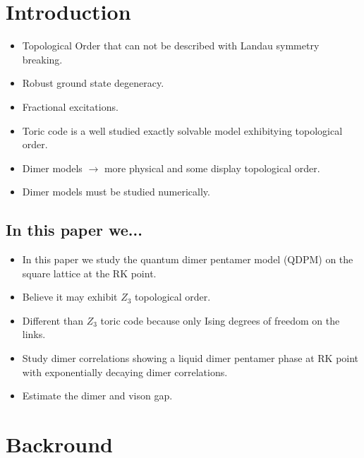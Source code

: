 \documentclass[aps,floatfix,11pt]{revtex4-1}
\begin{document}
\section{Introduction}

    \begin{itemize}
        \item Topological Order that can not be described with Landau symmetry breaking.
        \item Robust ground state degeneracy.
        \item Fractional excitations.
        \item Toric code is a well studied exactly solvable model exhibitying topological order.
        \item Dimer models $\rightarrow$ more physical and some display topological order.
        \item Dimer models must be studied numerically.
    \end{itemize}

    \subsection{In this paper we... }
        \begin{itemize}
            \item In this paper we study the quantum dimer pentamer model (QDPM) on the square
                lattice at the RK point.
            \item Believe it may exhibit $Z_3$ topological order.
            \item Different than $Z_3$ toric code because only Ising degrees of freedom on the links.
            \item Study dimer correlations showing a liquid dimer pentamer phase at RK point with
                exponentially decaying dimer correlations.
            \item Estimate the dimer and vison gap.
        \end{itemize}


\section{Backround}
\end{document}

